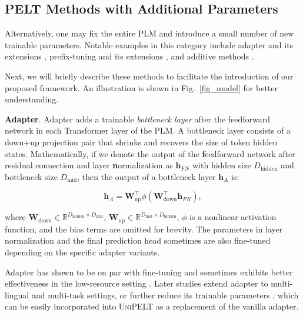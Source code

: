 \subsection{PELT Methods with Additional Parameters} Alternatively, one may fix the entire PLM and introduce a small number of new trainable parameters. Notable examples in this category include adapter \cite{houlsby2019parameter} and its extensions \cite{pfeiffer-etal-2021-adapterfusion,karimi-mahabadi-etal-2021-parameter}, prefix-tuning \cite{li-liang-2021-prefix} and its extensions \cite{lester2021power}, and additive methods \cite{guo-etal-2021-parameter,hu2021lora}.

Next, we will briefly describe these methods to facilitate the introduction of our proposed framework. An illustration is shown in Fig.~\ref{fig_model} for better understanding.

{{\bf Adapter}.} Adapter \cite{houlsby2019parameter} adds a trainable \textit{bottleneck layer} after the feedforward network in each Transformer layer of the PLM. A bottleneck layer consists of a down+up projection pair that shrinks and recovers the size of token hidden states. Mathematically, if we denote the output of the \textbf{f}eedforward network after residual connection and layer \textbf{n}ormalization as ${\bm{h}}_{FN}$ with hidden size $D_{\text{hidden}}$ and bottleneck size $D_{\text{mid}}$, then the output of a bottleneck layer ${\bm{h}}_A$ is:

\begin{equation}
    {\bm{h}}_A= {\bm{W}}_{\text{up}}^\intercal \phi({\bm{W}}_{\text{down}}^\intercal {\bm{h}}_{FN}),
\end{equation}

where ${\bm{W}}_{\text{down}} \in {\mathbb{R}}^{D_{\text{hidden}} \times D_{\text{mid}}}$, ${\bm{W}}_{\text{up}} \in {\mathbb{R}}^{D_{\text{mid}} \times D_{\text{hidden}}}$, $\phi$ is a nonlinear activation function, and the bias terms are omitted for brevity. The parameters in layer normalization and the final prediction head sometimes are also fine-tuned depending on the specific adapter variants.

Adapter has shown to be on par with fine-tuning and sometimes exhibits better effectiveness in the low-resource setting \cite{he-etal-2021-effectiveness}. Later studies extend adapter to multi-lingual \cite{pfeiffer-etal-2020-mad} and multi-task \cite{karimi-mahabadi-etal-2021-parameter} settings, or further reduce its trainable parameters \cite{mahabadi2021compacter}, which can be easily incorporated into \textsc{UniPELT} as a replacement of the vanilla adapter.

